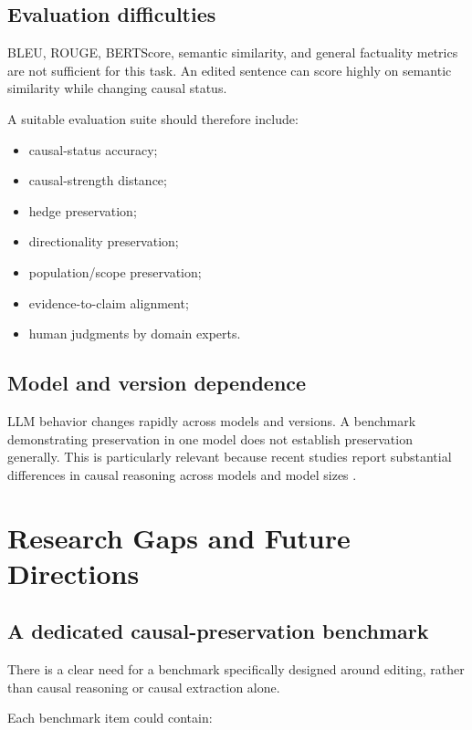 \documentclass[11pt]{article}
\begin{document}
\subsection{Evaluation difficulties}

BLEU, ROUGE, BERTScore, semantic similarity, and general factuality metrics are not sufficient for this task. An edited sentence can score highly on semantic similarity while changing causal status.

A suitable evaluation suite should therefore include:

\begin{itemize}
  \item causal-status accuracy;
  \item causal-strength distance;
  \item hedge preservation;
  \item directionality preservation;
  \item population/scope preservation;
  \item evidence-to-claim alignment;
  \item human judgments by domain experts.
\end{itemize}

\subsection{Model and version dependence}

LLM behavior changes rapidly across models and versions. A benchmark demonstrating preservation in one model does not establish preservation generally. This is particularly relevant because recent studies report substantial differences in causal reasoning across models and model sizes \cite{liu2026clear,saklad2026}.

\section{Research Gaps and Future Directions}
\label{sec:research-gaps}

\subsection{A dedicated causal-preservation benchmark}

There is a clear need for a benchmark specifically designed around editing, rather than causal reasoning or causal extraction alone.

Each benchmark item could contain:
\end{document}
